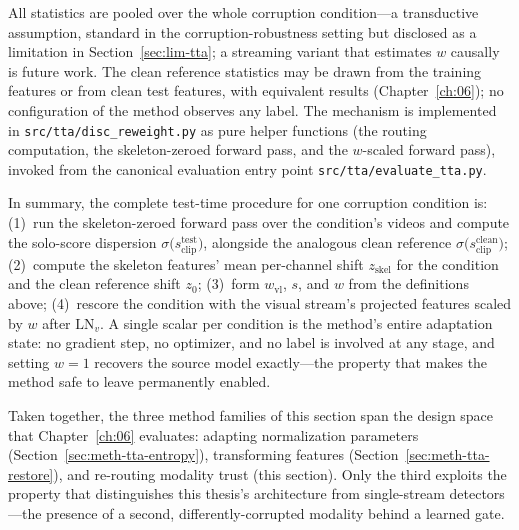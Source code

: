 All statistics are pooled over the whole corruption condition---a transductive assumption,
standard in the corruption-robustness setting but disclosed as a limitation in
Section~\ref{sec:lim-tta}; a streaming variant that estimates $w$ causally is future work. The clean
reference statistics may be drawn from the training features or from clean test features, with
equivalent results (Chapter~\ref{ch:06}); no configuration of the method observes any label. The
mechanism is implemented in \texttt{src/tta/disc\_reweight.py} as pure helper functions (the
routing computation, the skeleton-zeroed forward pass, and the $w$-scaled forward pass), invoked
from the canonical evaluation entry point \texttt{src/tta/evaluate\_tta.py}.

In summary, the complete test-time procedure for one corruption condition is:
(1)~run the skeleton-zeroed forward pass over the condition's videos and compute the solo-score
dispersion $\sigma\big(s_{\mathrm{clip}}^{\mathrm{test}}\big)$, alongside the analogous clean
reference $\sigma\big(s_{\mathrm{clip}}^{\mathrm{clean}}\big)$;
(2)~compute the skeleton features' mean per-channel shift $z_{\mathrm{skel}}$ for the condition
and the clean reference shift $z_0$;
(3)~form $w_{\mathrm{vl}}$, $s$, and $w$ from the definitions above;
(4)~rescore the condition with the visual stream's projected features scaled by $w$ after
$\text{LN}_v$. A single scalar per condition is the method's entire adaptation state: no
gradient step, no optimizer, and no label is involved at any stage, and setting $w=1$ recovers
the source model exactly---the property that makes the method safe to leave permanently enabled.

Taken together, the three method families of this section span the design space that
Chapter~\ref{ch:06} evaluates: adapting normalization parameters
(Section~\ref{sec:meth-tta-entropy}), transforming features
(Section~\ref{sec:meth-tta-restore}), and re-routing modality trust (this section). Only the
third exploits the property that distinguishes this thesis's architecture from single-stream
detectors---the presence of a second, differently-corrupted modality behind a learned gate.
